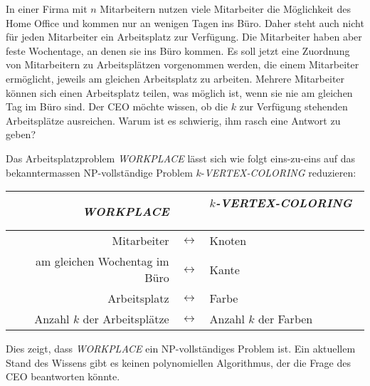 In einer Firma mit $n$ Mitarbeitern nutzen viele Mitarbeiter die
Möglichkeit des Home Office und kommen nur an wenigen Tagen ins Büro.
Daher steht auch nicht für jeden Mitarbeiter ein Arbeitsplatz zur
Verfügung.
Die Mitarbeiter haben aber feste Wochentage, an denen sie ins Büro
kommen.
Es soll jetzt eine Zuordnung von Mitarbeitern zu Arbeitsplätzen
vorgenommen werden, die einem Mitarbeiter ermöglicht, jeweils am
gleichen Arbeitsplatz zu arbeiten.
Mehrere Mitarbeiter können sich einen Arbeitsplatz teilen, was möglich
ist, wenn sie nie am gleichen Tag im Büro sind.
Der CEO möchte wissen, ob die $k$ zur Verfügung stehenden Arbeitsplätze
ausreichen.
Warum ist es schwierig, ihm rasch eine Antwort zu geben?

\begin{loesung}
Das Arbeitsplatzproblem \textit{WORKPLACE} lässt sich wie folgt eins-zu-eins
auf das bekanntermassen NP-vollständige Problem $k$-\textit{VERTEX-COLORING}
reduzieren:
\begin{center}
\begin{tabular}{r>{$}c<{$}l}
\textit{WORKPLACE} && \textit{$k$-VERTEX-COLORING}  \\
\hline
Mitarbeiter                   &\leftrightarrow& Knoten \\
am gleichen Wochentag im Büro &\leftrightarrow& Kante \\
Arbeitsplatz                  &\leftrightarrow& Farbe \\
Anzahl $k$ der Arbeitsplätze  &\leftrightarrow& Anzahl $k$ der Farben \\
\end{tabular}
\end{center}
Dies zeigt, dass \textit{WORKPLACE} ein NP-vollständiges Problem ist.
Ein aktuellem Stand des Wissens gibt es keinen polynomiellen Algorithmus,
der die Frage des CEO beantworten könnte.
\end{loesung}
